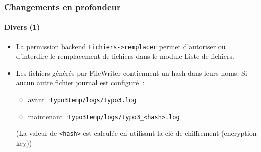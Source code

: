 
\begin{frame}[fragile]
	\frametitle{Changements en profondeur}
	\framesubtitle{Divers (1)}

	\lstset{basicstyle=\tiny\ttfamily}

	\begin{itemize}

		\item La permission backend \texttt{Fichiers->remplacer} permet d'autoriser ou
			d'interdire le remplacement de fichiers dans le module Liste de fichiers.


		\item Les fichiers générés par FileWriter contiennent un hash dans leurs noms.
			Si aucun autre fichier journal est configuré~:

			\begin{itemize}
				\item avant~:\tabto{2cm}\texttt{typo3temp/logs/typo3.log}
				\item maintenant~:\tabto{2cm}\texttt{typo3temp/logs/typo3\_<hash>.log}
			\end{itemize}

			\small(La valeur de \texttt{<hash>} est calculée en utilisant la clé de chiffrement (encryption key))\normalsize


	\end{itemize}

\end{frame}


